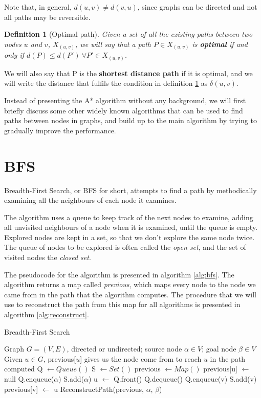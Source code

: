 \documentclass[12pt]{report}
\newtheorem{definition}[theorem]{Definition}
\begin{document}
Note that, in general, $d(u, v) \neq d(v, u)$, since graphs can be directed and not all paths may be reversible.

\begin{definition}[Optimal path]
\label{def:optimal}
Given a set of all the existing paths between two nodes $u$ and $v$, $X_{(u, v)}$, we will say that a path $P \in X_{(u,v)}$ is \textbf{optimal} if and only if $d(P) \le d(P') \ \forall P' \in X_{(u, v)}$.
\end{definition}

We will also say that P is the \textbf{shortest distance path} if it is optimal, and we will write the distance that fulfils the condition in definition \ref{def:optimal} as $\delta(u,v)$.


Instead of presenting the A* algorithm without any background, we will first briefly discuss some other widely known algorithms that can be used to find paths between nodes in graphs, and build up to the main algorithm by trying to gradually improve the performance.

\section{BFS}
Breadth-First Search, or BFS for short, attempts to find a path by methodically examining all the neighbours of each node it examines.

The algorithm uses a queue to keep track of the next nodes to examine, adding all unvisited neighbours of a node when it is examined, until the queue is empty. Explored nodes are kept in a set, so that we don't explore the same node twice. The queue of nodes to be explored is often called the \emph{open set}, and the set of visited nodes the \emph{closed set}.

The pseudocode for the algorithm is presented in algorithm \ref{alg:bfs}. The algorithm returns a map called \emph{previous}, which maps every node to the node we came from in the path that the algorithm computes. The procedure that we will use to reconstruct the path from this map for all algorithms is presented in algorithm \ref{alg:reconstruct}.

\begin{algorithm}
\caption{Breadth-First Search}
\label{alg:bfs}
\begin{algorithmic}[1]
\Require Graph $G = (V, E)$, directed or undirected; source node $\alpha \in V$; goal node $\beta \in V$
\Ensure Given $u \in G$, previous[$u$] gives us the node come from to reach $u$ in the path computed
\State Q $\gets Queue()$
\State S $\gets Set()$ 
\State previous $\gets Map()$
	\State previous[u] $\gets$ null
\EndFor
\State Q.enqueue($\alpha$)
\State S.add($\alpha$)
	\State u $\gets$ Q.front()
	\State Q.dequeue()
			\State Q.enqueue(v)
			\State S.add(v)
			\State previous[v] $\gets$ u
		\EndIf
	\EndFor
\EndWhile
\State \Return ReconstructPath(previous, $\alpha$, $\beta$)
\EndProcedure
\end{algorithmic}
\end{algorithm}
\end{document}
